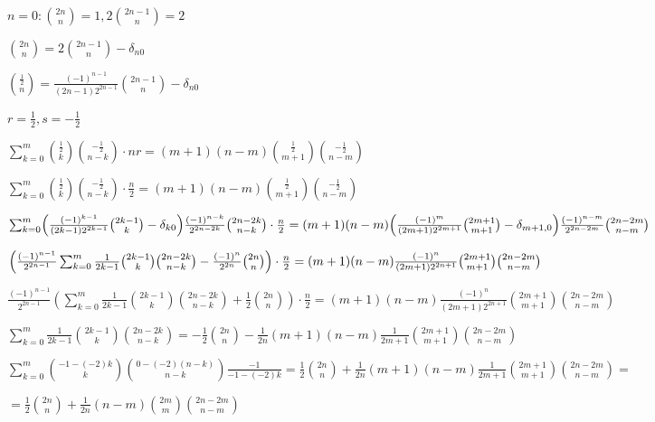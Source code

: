 \documentclass{article}
\begin{document}
\( n = 0: \binom{2n}{n} = 1, 2 \binom{2n-1}{n} = 2 \)

\( \binom{2n}{n} = 2 \binom{2n-1}{n} - \delta_{n0} \)

\( \binom{\frac{1}{2}}{n} = \frac{(-1)^{n-1}}{(2n-1) 2^{2n-1}} \binom{2n-1}{n} - \delta_{n0} \)

\( r = \frac{1}{2}, s = -\frac{1}{2} \)

\( \sum_{k=0}^m \binom{\frac{1}{2}}{k}\binom{-\frac{1}{2}}{n-k} \cdot nr = (m+1)(n-m) \binom{\frac{1}{2}}{m+1}\binom{-\frac{1}{2}}{n-m} \)

\( \sum_{k=0}^m \binom{\frac{1}{2}}{k}\binom{-\frac{1}{2}}{n-k} \cdot \frac{n}{2} = (m+1)(n-m) \binom{\frac{1}{2}}{m+1}\binom{-\frac{1}{2}}{n-m} \)

\( \sum_{k=0}^m \Bigl(\frac{(-1)^{k-1}}{(2k-1) 2^{2k-1}} \binom{2k-1}{k} - \delta_{k0}\Bigr) \frac{(-1)^{n-k}}{2^{2n-2k}} \binom{2n-2k}{n-k} \cdot \frac{n}{2} = (m+1)(n-m) \Bigl(\frac{(-1)^m}{(2m+1) 2^{2m+1}} \binom{2m+1}{m+1} - \delta_{m+1,0}\Bigr) \frac{(-1)^{n-m}}{2^{2n-2m}} \binom{2n-2m}{n-m} \)

\( \Bigl(\frac{(-1)^{n-1}}{2^{2n-1}}\sum_{k=0}^m \frac{1}{2k-1} \binom{2k-1}{k} \binom{2n-2k}{n-k} - \frac{(-1)^{n}}{2^{2n}} \binom{2n}{n}\Bigr) \cdot \frac{n}{2} = (m+1)(n-m) \frac{(-1)^n}{(2m+1) 2^{2n+1}} \binom{2m+1}{m+1} \binom{2n-2m}{n-m} \)

\( \frac{(-1)^{n-1}}{2^{2n-1}} (\sum_{k=0}^m \frac{1}{2k-1} \binom{2k-1}{k} \binom{2n-2k}{n-k} + \frac{1}{2} \binom{2n}{n}) \cdot \frac{n}{2} = (m+1)(n-m) \frac{(-1)^n}{(2m+1) 2^{2n+1}} \binom{2m+1}{m+1} \binom{2n-2m}{n-m} \)

\( \sum_{k=0}^m \frac{1}{2k-1} \binom{2k-1}{k} \binom{2n-2k}{n-k} = - \frac{1}{2} \binom{2n}{n} - \frac{1}{2n} (m+1)(n-m) \frac{1}{2m+1} \binom{2m+1}{m+1} \binom{2n-2m}{n-m} \)

\( \sum_{k=0}^m \binom{-1-(-2)k}{k} \binom{0 - (-2)(n-k)}{n-k} \frac{-1}{-1-(-2)k} = \frac{1}{2} \binom{2n}{n} + \frac{1}{2n} (m+1)(n-m) \frac{1}{2m+1} \binom{2m+1}{m+1} \binom{2n-2m}{n-m} = \)

\( =  \frac{1}{2} \binom{2n}{n} + \frac{1}{2n} (n-m) \binom{2m}{m} \binom{2n-2m}{n-m} \)
\end{document}
